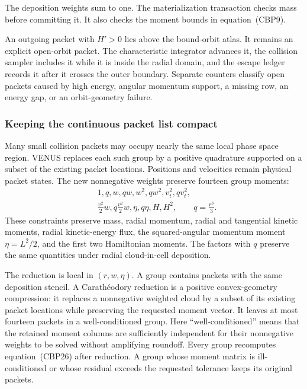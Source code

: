 The deposition weights sum to one.  The materialization transaction checks
mass before committing it.  It also checks the moment bounds in
equation~(CBP9).

An outgoing packet with \(H'>0\) lies above the bound-orbit atlas.  It remains
an explicit open-orbit packet.  The characteristic integrator advances it,
the collision sampler includes it while it is inside the radial domain, and
the escape ledger records it after it crosses the outer boundary.  Separate
counters classify open packets caused by high energy, angular momentum
support, a missing row, an energy gap, or an orbit-geometry failure.

\subsubsection{Keeping the continuous packet list compact}

Many small collision packets may occupy nearly the same local phase space
region.  VENUS replaces each such group by a positive quadrature supported on
a subset of the existing packet locations.  Positions and velocities remain
physical packet states.  The new nonnegative weights preserve fourteen group
moments:
\begin{align*}
&1, q, w, qw, w^2, qw^2, v_t^2, qv_t^2,\\
&\frac{v^2}{2}w, q\frac{v^2}{2}w,
 \eta, q\eta, H, H^2,\qquad q=\frac{r^3}{3}.          \tag{CBP26}
\end{align*}
These constraints preserve mass, radial momentum, radial and tangential
kinetic moments, radial kinetic-energy flux, the squared-angular momentum
moment \(\eta=L^2/2\), and the first
two Hamiltonian moments.  The factors with \(q\) preserve the same quantities
under radial cloud-in-cell deposition.

The reduction is local in \((r,w,\eta)\).  A group contains packets with the
same deposition stencil.  A Carath\'eodory reduction is a positive
convex-geometry compression: it replaces a nonnegative weighted cloud by a
subset of its existing packet locations while preserving the requested
moment vector.  It leaves at most fourteen packets in a well-conditioned
group.  Here ``well-conditioned'' means that the retained moment columns are
sufficiently independent for their nonnegative weights to be solved without
amplifying roundoff.  Every group recomputes equation~(CBP26) after reduction.
A group whose moment matrix is ill-conditioned or whose residual exceeds the
requested tolerance keeps its original packets.

